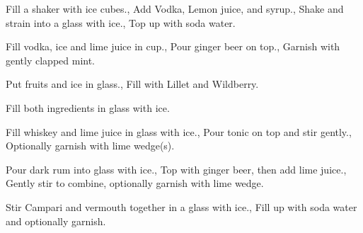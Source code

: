\documentclass[../main.tex]{subfiles}
\begin{document}

    {
            {Fill a shaker with ice cubes.},
            {Add Vodka, Lemon juice, and syrup.},
            {Shake and strain into a glass with ice.},
            {Top up with soda water.}
    }
    {}%

    \cocktailDivider

    {
            {Fill vodka, ice and lime juice in cup.},
            {Pour ginger beer on top.},
            {Garnish with gently clapped mint.}
    }
    {}

    \cocktailDivider

    {
            {Put fruits and ice in glass.},
            {Fill with Lillet and Wildberry.}
    }
    {}

    \cocktailDivider

    {
            {Fill both ingredients in glass with ice}.
    }
    {}

    \cocktailDivider

    {
            {Fill whiskey and lime juice in glass with ice.},
            {Pour tonic on top and stir gently.},
            {Optionally garnish with lime wedge(s).}
    }
    {}

    \cocktailDivider

    {
            {Pour dark rum into glass with ice.},
            {Top with ginger beer, then add lime juice.},
            {Gently stir to combine, optionally garnish with lime wedge.}
    }
    {}

    \clearpage

    {
            {Stir Campari and vermouth together in a glass with ice.},
            {Fill up with soda water and optionally garnish.}
    }
    {}
\end{document}
